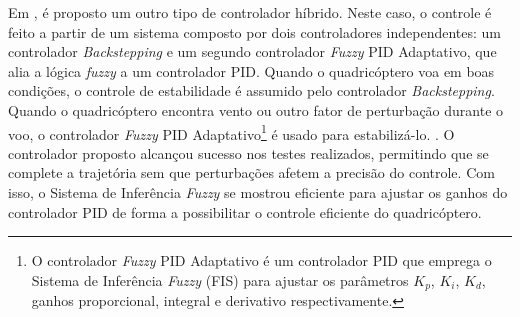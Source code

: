 %
Em \cite{Gao2014Stability}, é proposto um outro tipo de controlador híbrido. Neste caso, o controle é feito a partir de um sistema composto por dois controladores independentes: um controlador \textit{Backstepping} e um segundo controlador \textit{Fuzzy} PID Adaptativo, que alia a lógica \textit{fuzzy} a um controlador PID. Quando o quadricóptero voa em boas condições, o controle de estabilidade é assumido pelo controlador \textit{Backstepping}. Quando o quadricóptero encontra vento ou outro fator de perturbação durante o voo, o controlador \textit{Fuzzy} PID Adaptativo\footnote{O controlador \textit{Fuzzy} PID Adaptativo é um controlador PID que emprega o Sistema de Inferência \textit{Fuzzy} (FIS) para ajustar os parâmetros $K_p$, $K_i$, $K_d$, ganhos proporcional, integral e derivativo respectivamente.} é usado para estabilizá-lo. . O controlador proposto alcançou sucesso nos testes realizados, permitindo que se complete a trajetória sem que perturbações afetem a precisão do controle. Com isso, o Sistema de Inferência \textit{Fuzzy} se mostrou eficiente para ajustar os ganhos do controlador PID de forma a possibilitar o controle eficiente do quadricóptero.

%
%
%
%
%
%
%
%

